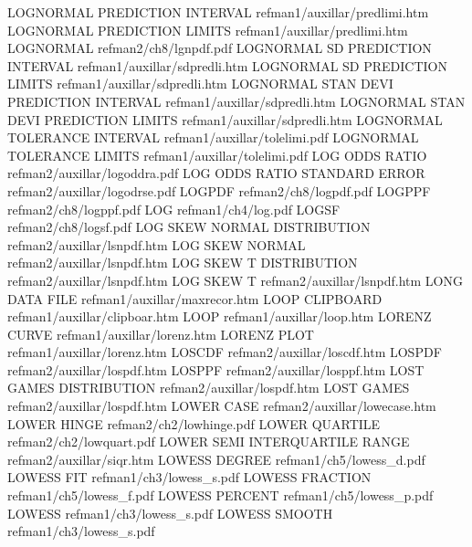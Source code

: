 LOGNORMAL PREDICTION INTERVAL           refman1/auxillar/predlimi.htm
LOGNORMAL PREDICTION LIMITS             refman1/auxillar/predlimi.htm
LOGNORMAL                               refman2/ch8/lgnpdf.pdf
LOGNORMAL SD PREDICTION INTERVAL        refman1/auxillar/sdpredli.htm
LOGNORMAL SD PREDICTION LIMITS          refman1/auxillar/sdpredli.htm
LOGNORMAL STAN DEVI PREDICTION INTERVAL refman1/auxillar/sdpredli.htm
LOGNORMAL STAN DEVI PREDICTION LIMITS   refman1/auxillar/sdpredli.htm
LOGNORMAL TOLERANCE INTERVAL            refman1/auxillar/tolelimi.pdf
LOGNORMAL TOLERANCE LIMITS              refman1/auxillar/tolelimi.pdf
LOG ODDS RATIO                          refman2/auxillar/logoddra.pdf
LOG ODDS RATIO STANDARD ERROR           refman2/auxillar/logodrse.pdf
LOGPDF                                  refman2/ch8/logpdf.pdf
LOGPPF                                  refman2/ch8/logppf.pdf
LOG                                     refman1/ch4/log.pdf
LOGSF                                   refman2/ch8/logsf.pdf
LOG SKEW NORMAL DISTRIBUTION            refman2/auxillar/lsnpdf.htm
LOG SKEW NORMAL                         refman2/auxillar/lsnpdf.htm
LOG SKEW T DISTRIBUTION                 refman2/auxillar/lsnpdf.htm
LOG SKEW T                              refman2/auxillar/lsnpdf.htm
LONG DATA FILE                          refman1/auxillar/maxrecor.htm
LOOP CLIPBOARD                          refman1/auxillar/clipboar.htm
LOOP                                    refman1/auxillar/loop.htm
LORENZ CURVE                            refman1/auxillar/lorenz.htm
LORENZ PLOT                             refman1/auxillar/lorenz.htm
LOSCDF                                  refman2/auxillar/loscdf.htm
LOSPDF                                  refman2/auxillar/lospdf.htm
LOSPPF                                  refman2/auxillar/losppf.htm
LOST GAMES DISTRIBUTION                 refman2/auxillar/lospdf.htm
LOST GAMES                              refman2/auxillar/lospdf.htm
LOWER CASE                              refman2/auxillar/lowecase.htm
LOWER HINGE                             refman2/ch2/lowhinge.pdf
LOWER QUARTILE                          refman2/ch2/lowquart.pdf
LOWER SEMI INTERQUARTILE RANGE          refman2/auxillar/siqr.htm
LOWESS DEGREE                           refman1/ch5/lowess_d.pdf
LOWESS FIT                              refman1/ch3/lowess_s.pdf
LOWESS FRACTION                         refman1/ch5/lowess_f.pdf
LOWESS PERCENT                          refman1/ch5/lowess_p.pdf
LOWESS                                  refman1/ch3/lowess_s.pdf
LOWESS SMOOTH                           refman1/ch3/lowess_s.pdf
